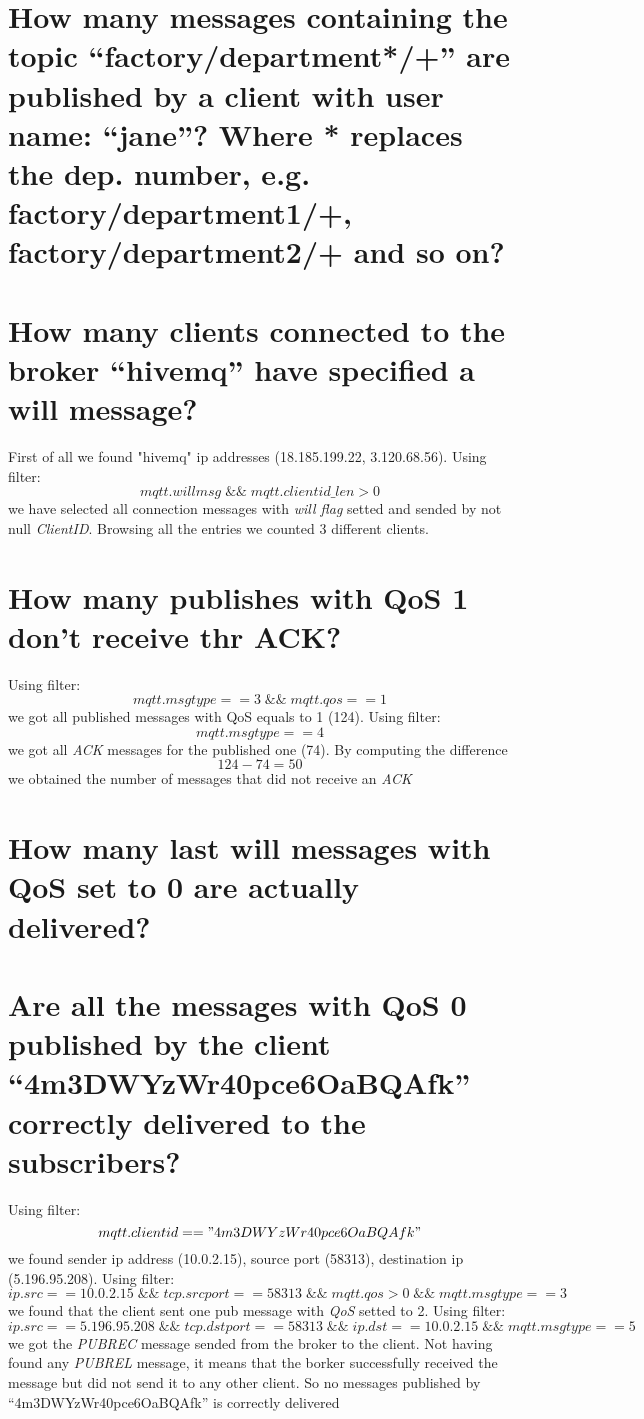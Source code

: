 \documentclass{article}
\begin{document}
\section{How many messages containing the topic
“factory/department*/+” are published by a client with
user name: “jane”? Where * replaces the dep. number,
e.g. factory/department1/+, factory/department2/+
and so on?}

\section{How many clients connected to the broker “hivemq”
have specified a will message?}
First of all we found "hivemq" ip addresses (18.185.199.22, 3.120.68.56). Using filter: \[ mqtt.willmsg \; \&\& \; mqtt.clientid\_len > 0 \] we have selected
all connection messages with \textit{will flag} setted and sended by not null \textit{ClientID}. Browsing all the entries we counted 3 different clients.

\section{How many publishes with QoS 1 don't receive thr ACK?}
Using filter: \[ mqtt.msgtype == 3 \; \&\& \; mqtt.qos == 1 \] we got all published messages with QoS equals to 1 (124). \hfill \break
Using filter: \[ mqtt.msgtype == 4 \] we got all \textit{ACK} messages for the published one (74). \hfill \break
By computing the difference \[ 124-74 = 50\] we obtained the number of messages that did not receive an \textit{ACK}

\section{How many last will messages with QoS set to 0 are
actually delivered?}

\section{Are all the messages with QoS 0 published by the
client “4m3DWYzWr40pce6OaBQAfk” correctly delivered
to the subscribers?}
Using filter: \[ mqtt.clientid == "4m3DWYzWr40pce6OaBQAfk"\] we found sender ip address (10.0.2.15), source port (58313), destination ip (5.196.95.208). \hfill \break
Using filter: \[ ip.src == 10.0.2.15 \; \&\& \; tcp.srcport == 58313 \; \&\& \; mqtt.qos > 0\; \&\& \; mqtt.msgtype == 3\] we found that the client sent one pub message with \textit{QoS} setted to 2. \hfill \break
Using filter: \[ ip.src == 5.196.95.208 \; \&\& \; tcp.dstport == 58313 \; \&\& \; ip.dst == 10.0.2.15 \; \&\& \; mqtt.msgtype == 5\] we got the \textit{PUBREC} message sended from the broker to the client. \hfill \break
Not having found any \textit{PUBREL} message, it means that the borker successfully received the message but did not send it to any other client. So no messages published by “4m3DWYzWr40pce6OaBQAfk” is correctly delivered
\end{document}
